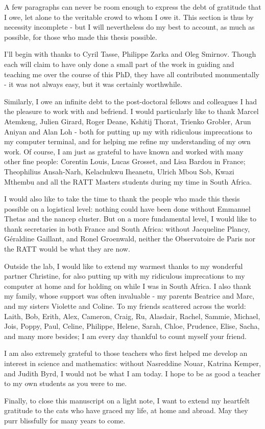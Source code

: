 \pg
A few paragraphs can never be room enough to express the debt of gratitude that I owe, let alone to the veritable crowd to whom I owe it. This section is thus by necessity incomplete - but I will nevertheless do my best to account, as much as possible, for those who made this thesis possible.

\pg
I'll begin with thanks to Cyril Tasse, Philippe Zarka and Oleg Smirnov. Though each will claim to have only done a small part of the work in guiding and teaching me over the course of this PhD, they have all contributed monumentally - it was not always easy, but it was certainly worthwhile.

\pg
Similarly, I owe an infinite debt to the post-doctoral fellows and colleagues I had the pleasure to work with and befriend. I would particularly like to thank Marcel Atemkeng, Julien Girard, Roger Deane, Kshitij Thorat, Trienko Grobler, Arun Aniyan and Alan Loh - both for putting up my with ridiculous imprecations to my computer terminal, and for helping me refine my understanding of my own work. Of course, I am just as grateful to have known and worked with many other fine people: Corentin Louis, Lucas Grosset, and Lisa Bardou in France; Theophilius Ansah-Narh, Kelachukwu Iheanetu, Ulrich Mbou Sob, Kwazi Mthembu and all the RATT Masters students during my time in South Africa.

\pg
I would also like to take the time to thank the people who made this thesis possible on a logistical level: nothing could have been done without Emmanuel Thetas and the nancep cluster. But on a more fundamental level, I would like to thank secretaries in both France and South Africa: without Jacqueline Plancy, Géraldine Gaillant, and Ronel Groenwald, neither the Observatoire de Paris nor the RATT would be what they are now.

\pg
Outside the lab, I would like to extend my warmest thanks to my wonderful partner Christine, for also putting up with my ridiculous imprecations to my computer at home and for holding on while I was in South Africa. I also thank my family, whose support was often invaluable - my parents Beatrice and Marc, and my sisters Violette and Coline. To my friends scattered across the world: Laith, Bob, Erith, Alex, Cameron, Craig, Ru, Alasdair, Rachel, Sammie, Michael, Jois, Poppy, Paul, Celine, Philippe, Helene, Sarah, Chloe, Prudence, Elise, Sacha, and many more besides; I am every day thankful to count myself your friend.

\pg
I am also extremely grateful to those teachers who first helped me develop an interest in science and mathematics: without Nasreddine Nouar, Katrina Kemper, and Judith Byrd, I would not be what I am today. I hope to be as good a teacher to my own students as you were to me.

\pg
Finally, to close this manuscript on a light note, I want to extend my heartfelt gratitude to the cats who have graced my life, at home and abroad. May they purr blissfully for many years to come.